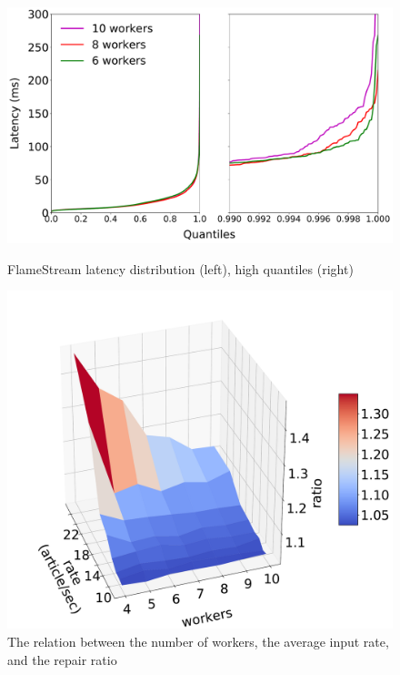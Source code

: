 \begin{figure}[ht]
  \centering
  \begin{minipage}[b]{.58\textwidth}
    \centering
    \includegraphics[width=\linewidth]{pics/fs-index-quantiles}
    \caption{FlameStream latency distribution (left),  high quantiles (right)}
    \label{fs-scalability}
  \end{minipage}%
  \hspace{\fill}
  \begin{minipage}[b]{.40\textwidth}
    \centering
    \includegraphics[width=\linewidth]{pics/overhead}
    \caption{The relation between the number of workers, the average input rate, and the repair ratio}
    \label{overhead}
  \end{minipage}%
\end{figure}

